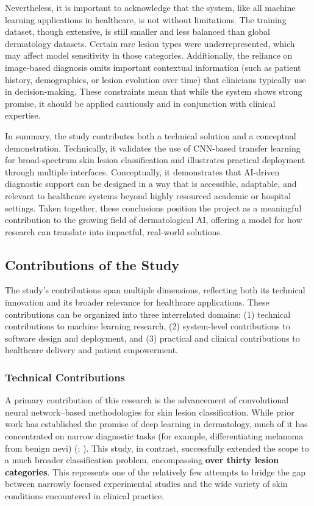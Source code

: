 \documentclass[
  12pt,
  oneside]{article}
\begin{document}
Nevertheless, it is important to acknowledge that the system, like all
machine learning applications in healthcare, is not without limitations.
The training dataset, though extensive, is still smaller and less
balanced than global dermatology datasets. Certain rare lesion types
were underrepresented, which may affect model sensitivity in those
categories. Additionally, the reliance on image-based diagnosis omits
important contextual information (such as patient history, demographics,
or lesion evolution over time) that clinicians typically use in
decision-making. These constraints mean that while the system shows
strong promise, it should be applied cautiously and in conjunction with
clinical expertise.

In summary, the study contributes both a technical solution and a
conceptual demonstration. Technically, it validates the use of CNN-based
transfer learning for broad-spectrum skin lesion classification and
illustrates practical deployment through multiple interfaces.
Conceptually, it demonstrates that AI-driven diagnostic support can be
designed in a way that is accessible, adaptable, and relevant to
healthcare systems beyond highly resourced academic or hospital
settings. Taken together, these conclusions position the project as a
meaningful contribution to the growing field of dermatological AI,
offering a model for how research can translate into impactful,
real-world solutions.

\subsection{Contributions of the
Study}\label{contributions-of-the-study}

The study's contributions span multiple dimensions, reflecting both its
technical innovation and its broader relevance for healthcare
applications. These contributions can be organized into three
interrelated domains: (1) technical contributions to machine learning
research, (2) system-level contributions to software design and
deployment, and (3) practical and clinical contributions to healthcare
delivery and patient empowerment.

\subsubsection{Technical Contributions}\label{technical-contributions}

A primary contribution of this research is the advancement of
convolutional neural network--based methodologies for skin lesion
classification. While prior work has established the promise of deep
learning in dermatology, much of it has concentrated on narrow
diagnostic tasks (for example, differentiating melanoma from benign
nevi) (;
). This
study, in contrast, successfully extended the scope to a much broader
classification problem, encompassing \textbf{over thirty lesion
categories}. This represents one of the relatively few attempts to
bridge the gap between narrowly focused experimental studies and the
wide variety of skin conditions encountered in clinical practice.
\end{document}
